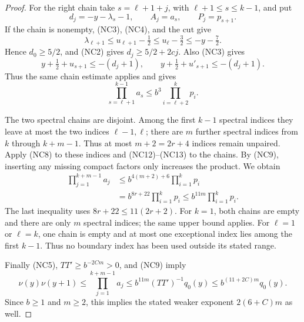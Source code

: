 \begin{proof}
For the right chain take \(s=\ell+1+j\), with
\(\ell+1\le s\le k-1\), and put
\[
 d_j=-y-\lambda_s-1,\qquad A_j=a_s,\qquad P_j=p_{s+1}.
\]
If the chain is nonempty, (NC3), (NC4), and the cut give
\[
 \lambda_{\ell+1}\le u_{\ell+1}-\tfrac12
                         \le u_\ell-\tfrac32
                         \le-y-\tfrac72.
\]
Hence \(d_0\ge5/2\), and (NC2) gives \(d_j\ge5/2+2cj\).
Also (NC3) gives
\[
 y+\tfrac12+u_{s+1}\le-(d_j+1),\qquad
 y+\tfrac12+u'_{s+1}\le-(d_j+1).
\]
Thus the same chain estimate applies and gives
\[
       \prod_{s=\ell+1}^{k-1}a_s
                          \le b^3\prod_{i=\ell+2}^{k}p_i.
                                                        \tag{NC13}
\]

The two spectral chains are disjoint. Among the first \(k-1\)
spectral indices they leave at most the two indices
\(\ell-1,\ell\); there are \(m\) further spectral indices
from \(k\) through \(k+m-1\). Thus at most \(m+2=2r+4\)
indices remain unpaired. Apply (NC8) to these indices and
(NC12)--(NC13) to the chains. By (NC9), inserting any missing
compact factors only increases the product. We obtain
\[
 \begin{split}
 \prod_{j=1}^{k+m-1}a_j
   &\le b^{4(m+2)+6}\prod_{i=1}^kp_i\\
   &=b^{8r+22}\prod_{i=1}^kp_i
     \le b^{11m}\prod_{i=1}^kp_i .
 \end{split}                                           \tag{NC14}
\]
The last inequality uses \(8r+22\le11(2r+2)\).
For \(k=1\), both chains are empty and there are only \(m\)
spectral indices; the same upper bound applies. For
\(\ell=1\) or \(\ell=k\), one chain is empty and at most
one exceptional index lies among the first \(k-1\).
Thus no boundary index has been used outside its stated range.

Finally (NC5), \(TT'\ge b^{-2Cm}>0\), and (NC9) imply
\[
 \nu(y)\nu(y+1)
 \le\prod_{j=1}^{k+m-1}a_j
 \le b^{11m}(TT')^{-1}q_0(y)
 \le b^{(11+2C)m}q_0(y).
\]
Since \(b\ge1\) and \(m\ge2\), this implies the stated weaker
exponent \(2(6+C)m\) as well.
\end{proof}

